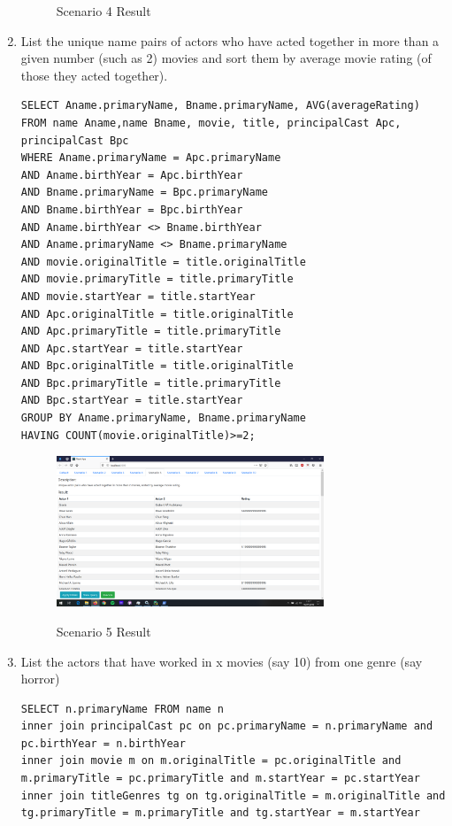 \documentclass{sig-alternate}
\begin{document}
\begin{enumerate}
\begin{figure}[ht]
		    \label{frontend}
                    \caption{Scenario 4 Result}
		    \centering
	        \end{figure}
		\item List the unique name pairs of actors who have acted together in more than a given number (such as 2)  movies and sort them by average movie rating (of those they acted together).
                \begin{lstlisting}
SELECT Aname.primaryName, Bname.primaryName, AVG(averageRating)
FROM name Aname,name Bname, movie, title, principalCast Apc, principalCast Bpc
WHERE Aname.primaryName = Apc.primaryName 
AND Aname.birthYear = Apc.birthYear 
AND Bname.primaryName = Bpc.primaryName 
AND Bname.birthYear = Bpc.birthYear
AND Aname.birthYear <> Bname.birthYear 
AND Aname.primaryName <> Bname.primaryName
AND movie.originalTitle = title.originalTitle 
AND movie.primaryTitle = title.primaryTitle
AND movie.startYear = title.startYear 
AND Apc.originalTitle = title.originalTitle 
AND Apc.primaryTitle = title.primaryTitle 
AND Apc.startYear = title.startYear 
AND Bpc.originalTitle = title.originalTitle 
AND Bpc.primaryTitle = title.primaryTitle
AND Bpc.startYear = title.startYear 
GROUP BY Aname.primaryName, Bname.primaryName
HAVING COUNT(movie.originalTitle)>=2;
                \end{lstlisting}
         	\begin{figure}[ht]
		    \includegraphics[width=8cm]{Screenshots/Scenario5.png}
		    \label{frontend}
                    \caption{Scenario 5 Result}
		    \centering
	        \end{figure}
		\item List the actors that have worked in x movies (say 10) from one genre (say horror)
                \begin{lstlisting}
SELECT n.primaryName FROM name n
inner join principalCast pc on pc.primaryName = n.primaryName and pc.birthYear = n.birthYear
inner join movie m on m.originalTitle = pc.originalTitle and m.primaryTitle = pc.primaryTitle and m.startYear = pc.startYear
inner join titleGenres tg on tg.originalTitle = m.originalTitle and tg.primaryTitle = m.primaryTitle and tg.startYear = m.startYear

\end{lstlisting}
\end{enumerate}
\end{document}
